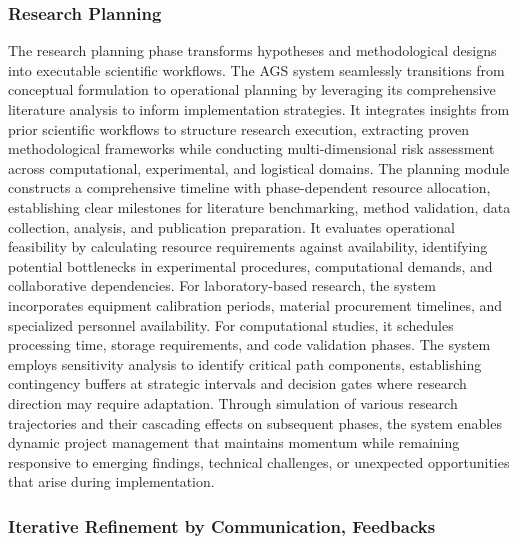 \subsubsection*{Research Planning}

The research planning phase transforms hypotheses and methodological designs into executable scientific workflows. The AGS system seamlessly transitions from conceptual formulation to operational planning by leveraging its comprehensive literature analysis to inform implementation strategies. It integrates insights from prior scientific workflows to structure research execution, extracting proven methodological frameworks while conducting multi-dimensional risk assessment across computational, experimental, and logistical domains. The planning module constructs a comprehensive timeline with phase-dependent resource allocation, establishing clear milestones for literature benchmarking, method validation, data collection, analysis, and publication preparation. It evaluates operational feasibility by calculating resource requirements against availability, identifying potential bottlenecks in experimental procedures, computational demands, and collaborative dependencies. For laboratory-based research, the system incorporates equipment calibration periods, material procurement timelines, and specialized personnel availability. For computational studies, it schedules processing time, storage requirements, and code validation phases. The system employs sensitivity analysis to identify critical path components, establishing contingency buffers at strategic intervals and decision gates where research direction may require adaptation. Through simulation of various research trajectories and their cascading effects on subsequent phases, the system enables dynamic project management that maintains momentum while remaining responsive to emerging findings, technical challenges, or unexpected opportunities that arise during implementation.



\subsubsection*{Iterative Refinement by Communication, Feedbacks}

